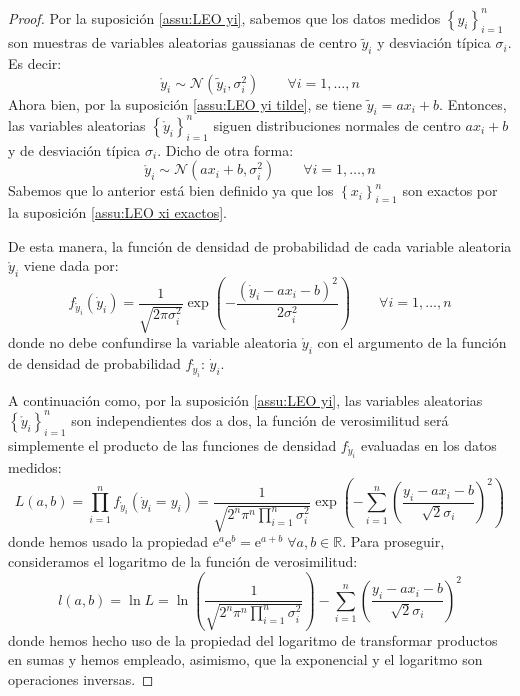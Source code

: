 \documentclass[11pt,a4paper,spanish]{article}
\numberwithin{equation}{section}
\numberwithin{table}{section}
\numberwithin{figure}{section}
\theoremstyle{definition}
\theoremstyle{remark}
\theoremstyle{definition}
\theoremstyle{remark}
\theoremstyle{plain}
\theoremstyle{plain}
\theoremstyle{plain}
\theoremstyle{plain}
\theoremstyle{plain}
\theoremstyle{plain}
\begin{document}
	\begin{proof}
		Por la suposición \vref{assu:LEO yi}, sabemos que los datos medidos
		$\left\{ y_{i}\right\} _{i=1}^{n}$ son muestras de variables aleatorias
		gaussianas de centro $\tilde{y}_{i}$ y desviación típica $\sigma_{i}$.
		Es decir:
		\[
		\mathring{y}_{i}\sim\mathcal{N}\left(\tilde{y}_{i},\sigma_{i}^{2}\right)\qquad\forall i=1,\dots,n
		\]
		Ahora bien, por la suposición \vref{assu:LEO yi tilde}, se tiene
		$\tilde{y}_{i}=ax_{i}+b$. Entonces, las variables aleatorias $\left\{ \mathring{y}_{i}\right\} _{i=1}^{n}$
		siguen distribuciones normales de centro $ax_{i}+b$ y de desviación
		típica $\sigma_{i}$. Dicho de otra forma:
		\[
		\mathring{y}_{i}\sim\mathcal{N}\left(ax_{i}+b,\sigma_{i}^{2}\right)\qquad\forall i=1,\dots,n
		\]
		Sabemos que lo anterior está bien definido ya que los $\left\{ x_{i}\right\} _{i=1}^{n}$
		son exactos por la suposición \vref{assu:LEO xi exactos}.
		
		De esta manera, la función de densidad de probabilidad de cada variable
		aleatoria $\mathring{y}_{i}$ viene dada por:
		\[
		f_{\mathring{y}_{i}}\left(\dot{y}_{i}\right)=\frac{1}{\sqrt{2\pi\sigma_{i}^{2}}}\exp\left(-\frac{\left(\dot{y}_{i}-ax_{i}-b\right)^{2}}{2\sigma_{i}^{2}}\right)\qquad\forall i=1,\dots,n
		\]
		donde no debe confundirse la variable aleatoria $\mathring{y}_{i}$
		con el argumento de la función de densidad de probabilidad $f_{\mathring{y}_{i}}$:
		$\dot{y}_{i}$. 
		
		A continuación como, por la suposición \vref{assu:LEO yi}, las variables
		aleatorias $\left\{ \mathring{y}_{i}\right\} _{i=1}^{n}$ son independientes
		dos a dos, la función de verosimilitud será simplemente el producto
		de las funciones de densidad $f_{\mathring{y}_{i}}$ evaluadas en
		los datos medidos:
		\[
		L\left(a,b\right)=\prod_{i=1}^{n}f_{\mathring{y}_{i}}\left(\dot{y}_{i}=y_{i}\right)=\frac{1}{\sqrt{2^{n}\pi^{n}\prod_{i=1}^{n}\sigma_{i}^{2}}}\exp\left(-\sum_{i=1}^{n}\left(\frac{y_{i}-ax_{i}-b}{\sqrt{2}\sigma_{i}}\right)^{2}\right)
		\]
		donde hemos usado la propiedad $\mathrm{e}^{a}\mathrm{e}^{b}=\mathrm{e}^{a+b}\;\forall a,b\in\mathbb{R}$.
		Para proseguir, consideramos el logaritmo de la función de verosimilitud:
		\[
		l\left(a,b\right)=\ln L=\ln\left(\frac{1}{\sqrt{2^{n}\pi^{n}\prod_{i=1}^{n}\sigma_{i}^{2}}}\right)-\sum_{i=1}^{n}\left(\frac{y_{i}-ax_{i}-b}{\sqrt{2}\sigma_{i}}\right)^{2}
		\]
		donde hemos hecho uso de la propiedad del logaritmo de transformar
		productos en sumas y hemos empleado, asimismo, que la exponencial
		y el logaritmo son operaciones inversas.
		

\end{proof}
\end{document}
